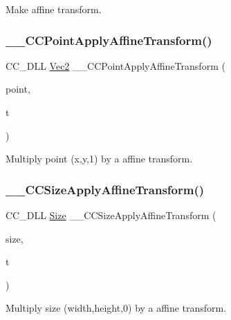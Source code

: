 Make affine transform. \mbox{\label{group__base_ga925cec1fb977da8fb3d8280ba82cc5c7}} 
\subsubsection{\texorpdfstring{\+\_\+\+\_\+\+C\+C\+Point\+Apply\+Affine\+Transform()}{\_\_CCPointApplyAffineTransform()}}
{\footnotesize\ttfamily C\+C\+\_\+\+D\+LL \hyperlink{classVec2}{Vec2} \+\_\+\+\_\+\+C\+C\+Point\+Apply\+Affine\+Transform (\begin{DoxyParamCaption}\item[{const \hyperlink{classVec2}{Vec2} \&}]{point,  }\item[{const \hyperlink{structAffineTransform}{Affine\+Transform} \&}]{t }\end{DoxyParamCaption})}

Multiply point (x,y,1) by a affine transform. \mbox{\label{group__base_ga40f990327de656e394d23b0650208008}} 
\subsubsection{\texorpdfstring{\+\_\+\+\_\+\+C\+C\+Size\+Apply\+Affine\+Transform()}{\_\_CCSizeApplyAffineTransform()}}
{\footnotesize\ttfamily C\+C\+\_\+\+D\+LL \hyperlink{classSize}{Size} \+\_\+\+\_\+\+C\+C\+Size\+Apply\+Affine\+Transform (\begin{DoxyParamCaption}\item[{const \hyperlink{classSize}{Size} \&}]{size,  }\item[{const \hyperlink{structAffineTransform}{Affine\+Transform} \&}]{t }\end{DoxyParamCaption})}

Multiply size (width,height,0) by a affine transform. \mbox{\label{group__base_gaf9077a0e9e26db5b6511f88839c3dbec}} 
